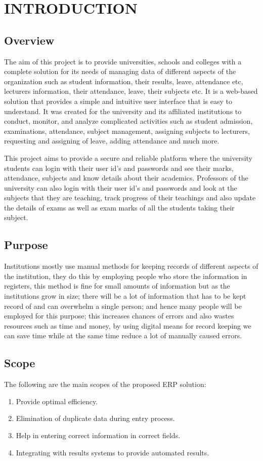 \section{INTRODUCTION}

\subsection{Overview}
The aim of this project is to provide universities, schools and colleges with a
complete solution for its needs of managing data of different aspects of the
organization such as student information, their results, leave, attendance etc,
lecturers information, their attendance, leave, their subjects etc. It is a
web-based solution that provides a simple and intuitive user interface that is
easy to understand. It was created for the university and its affiliated
institutions to conduct, monitor, and analyze complicated activities such as
student admission, examinations, attendance, subject management, assigning
subjects to lecturers, requesting and assigning of leave, adding attendance and
much more.

This project aims to provide a secure and reliable platform where the university
students can login with their user id's and passwords and see their marks,
attendance, subjects and know details about their academics. Professors of the
university can also login with their user id's and passwords and look at the
subjects that they are teaching, track progress of their teachings and also
update the details of exams as well as exam marks of all the students taking
their subject.

\subsection{Purpose}
Institutions mostly use manual methods for keeping records of different aspects
of the institution, they do this by employing people who store the information
in registers, this method is fine for small amounts of information but as the
institutions grow in size; there will be a lot of information that has to be
kept record of and can overwhelm a single person; and hence many people will be
employed for this purpose; this increases chances of errors and also wastes
resources such as time and money, by using digital means for record keeping we
can save time while at the same time reduce a lot of manually caused errors.

\subsection{Scope}
The following are the main scopes of the proposed ERP solution:
\begin{enumerate}
    \item Provide optimal efficiency.
    \item Elimination of duplicate data during entry process.
    \item Help in entering correct information in correct fields.
    \item Integrating with results systems to provide automated results.
\end{enumerate}
